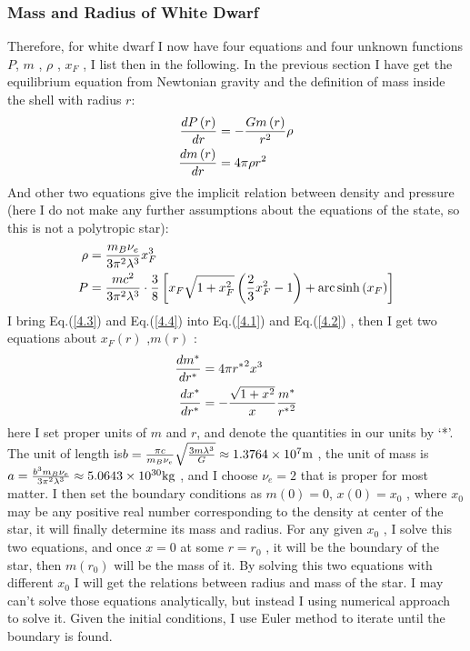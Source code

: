 \documentclass[preprint]{revtex4-1}
\begin{document}
\subsubsection{Mass and Radius of White Dwarf}
Therefore, for white dwarf I now have four equations and four unknown functions $P$, $m$ , $\rho$ , $x_F$ , I list then in the following.  In the previous section I have get the equilibrium equation from Newtonian gravity and the definition of mass inside the shell with radius $r$:
\begin{align}
{{dP\left( r \right)} \over {dr}} &=  - {{Gm\left( r \right)} \over {{r^2}}}\rho \label{4.1}\\
{{dm\left( r \right)} \over {dr}} &= 4\pi \rho {r^2} \label{4.2}
\end{align}
And other two equations give the implicit relation between density and pressure (here I do not make any further assumptions about the equations of the state, so this is not a polytropic star):
\begin{align}
\rho  &= {{{m_B}{\nu _e}} \over {3{\pi ^2}{\lambda ^3}}}x_F^3 \label{4.3}\\
P &= {{m{c^2}} \over {3{\pi ^2}{\lambda ^3}}} \cdot {3 \over 8}\left[ {{x_F}\sqrt {1 + x_F^2} \left( {{2 \over 3}x_F^2 - 1} \right) + {\mathop{\rm arc}\nolimits} \sinh \left( {{x_F}} \right)} \right] \label{4.4}
\end{align}
I bring Eq.(\ref{4.3}) and Eq.(\ref{4.4}) into Eq.(\ref{4.1}) and Eq.(\ref{4.2}) ,  then I get two equations about $x_F(r)$ ,$m(r)$ :
\begin{align}
{{d{m^*}} \over {d{r^*}}} &= 4\pi {r^*}^2{x^3} \label{4.5}\\
{{d{x^*}} \over {d{r^*}}} &=  - {{\sqrt {1 + {x^2}} } \over x}{{{m^*}} \over {{r^*}^2}} \label{4.6}
\end{align}
here I set proper units of $m$  and $r$, and denote the quantities in our units by ‘*’. The unit of length is$b = {{\pi c} \over {{m_B}{\nu _e}}}\sqrt {{{3m{\lambda ^3}} \over G}}  \approx 1.3764 \times {10^7}{\mathop{\rm m}\nolimits} $ , the unit of mass is $a = {{{b^3}{m_B}{\nu _e}} \over {3{\pi ^2}{\lambda ^3}}} \approx 5.0643 \times {10^{30}}{\mathop{\rm kg}\nolimits} $ , and I choose $\nu_e=2$ that is proper for most matter. I then set the boundary conditions as $m\left( 0 \right) = 0$, $x\left( 0 \right) = {x_0}$ , where $x_0$ may be any positive real number corresponding to the density at center of the star, it will finally determine its mass and radius. For any given $x_0$ , I solve this two equations, and once $x = 0$ at some $r = {r_0}$ , it will be the boundary of the star, then $m(r_0)$ will be the mass of it. By solving this two equations with different $x_0$ I will get the relations between radius and mass of the star. I may can’t solve those equations analytically, but instead I using numerical approach to solve it. Given the initial conditions, I use Euler method to iterate until the boundary is found. \par
\end{document}
